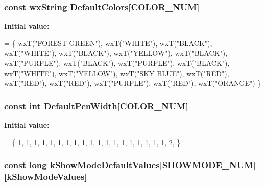 \hypertarget{a00190_a3076b2817e7f19e5cc9e208cb9d4d800}{
\subsubsection[{Default\-Colors}]{\setlength{\rightskip}{0pt plus 5cm}const wx\-String Default\-Colors\mbox{[}{\bf C\-O\-L\-O\-R\-\_\-\-N\-U\-M}\mbox{]}}}\label{a00190_a3076b2817e7f19e5cc9e208cb9d4d800}
{\bfseries Initial value\-:}
\begin{DoxyCode}
=
\{
    wxT(\textcolor{stringliteral}{"FOREST GREEN"}),
    wxT(\textcolor{stringliteral}{"WHITE"}),
    wxT(\textcolor{stringliteral}{"BLACK"}),
    wxT(\textcolor{stringliteral}{"WHITE"}),
    wxT(\textcolor{stringliteral}{"BLACK"}),
    wxT(\textcolor{stringliteral}{"YELLOW"}),
    wxT(\textcolor{stringliteral}{"BLACK"}),
    wxT(\textcolor{stringliteral}{"PURPLE"}),
    wxT(\textcolor{stringliteral}{"BLACK"}),
    wxT(\textcolor{stringliteral}{"PURPLE"}),
    wxT(\textcolor{stringliteral}{"BLACK"}),
    wxT(\textcolor{stringliteral}{"WHITE"}),
    wxT(\textcolor{stringliteral}{"YELLOW"}),
    wxT(\textcolor{stringliteral}{"SKY BLUE"}),
    wxT(\textcolor{stringliteral}{"RED"}),
    wxT(\textcolor{stringliteral}{"RED"}),
    wxT(\textcolor{stringliteral}{"RED"}),
    wxT(\textcolor{stringliteral}{"PURPLE"}),
    wxT(\textcolor{stringliteral}{"RED"}),
    wxT(\textcolor{stringliteral}{"ORANGE"})
\}
\end{DoxyCode}
\hypertarget{a00190_a88920aef299a66dd1f54a17d60872bb0}{
\subsubsection[{Default\-Pen\-Width}]{\setlength{\rightskip}{0pt plus 5cm}const int Default\-Pen\-Width\mbox{[}{\bf C\-O\-L\-O\-R\-\_\-\-N\-U\-M}\mbox{]}}}\label{a00190_a88920aef299a66dd1f54a17d60872bb0}
{\bfseries Initial value\-:}
\begin{DoxyCode}
=
\{
    1,
    1,
    1,
    1,
    1,
    1,
    1,
    1,
    1,
    1,
    1,
    1,
    1,
    1,
    1,
    1,
    1,
    1,
    1,
    2,
\}
\end{DoxyCode}
\hypertarget{a00190_a140c52883bc22e49070a982a0a4f8b66}{
\subsubsection[{k\-Show\-Mode\-Default\-Values}]{\setlength{\rightskip}{0pt plus 5cm}const long k\-Show\-Mode\-Default\-Values\mbox{[}{\bf S\-H\-O\-W\-M\-O\-D\-E\-\_\-\-N\-U\-M}\mbox{]}\mbox{[}{\bf k\-Show\-Mode\-Values}\mbox{]}}}\label{a00190_a140c52883bc22e49070a982a0a4f8b66}
